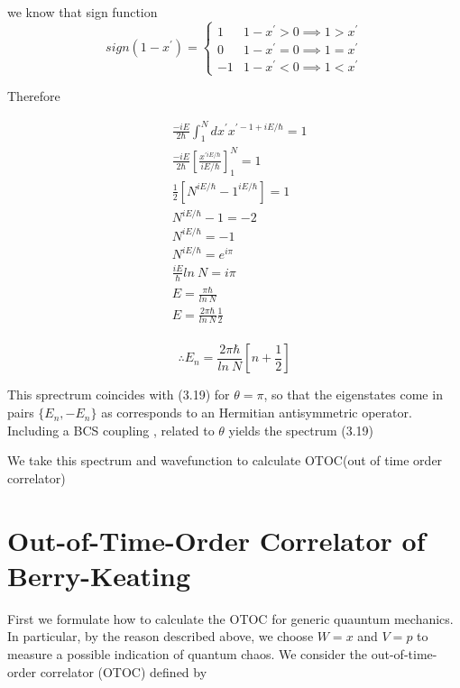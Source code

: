 \documentclass[12pt]{report}
\newcommand*{\1}{\hspace{1pt}}
\begin{document}
        we know that sign function
        \[ sign(1-x^{'}) = \begin{cases} 
            1 & 1-x^{'} > 0  \implies 1 > x^{'} \\
            0 & 1-x^{'} = 0 \implies 1=x^{'} \\
            -1 & 1-x^{'} < 0 \implies 1<x^{'} 
         \end{cases}
      \]

        Therefore

        \begin{align*}
            &\frac{-iE}{2\hbar}\int _{1}^{N} dx^{'} x^{' -1+iE/\hbar} = 1 \\
            &\frac{-iE}{2\hbar} \left[\frac{x^{'iE/\hbar}}{iE/\hbar}\right] _{1} ^{N} = 1 \\
            &\frac{1}{2} \left[N^{iE/\hbar} - 1^{iE/\hbar}\right] = 1 \\
            &N^{iE/\hbar} - 1 = -2 \\ 
            &N^{iE/\hbar} = -1 \\ 
            &N^{iE/\hbar} = e^{i\pi} \\ 
            &\frac{iE}{\hbar}ln\ N = i\pi \\ 
            &E = \frac{\pi\hbar}{ln\ N} \\ 
            &E = \frac{2\pi\hbar}{ln\ N}\frac{1}{2} \\  
        \end{align*}

        \begin{equation}
            \therefore E_{n} = \frac{2\pi\hbar}{ln\ N}\left[n + \frac{1}{2}\right] 
        \end{equation}

        This sprectrum coincides with (3.19) for $\theta=\pi$, so that the eigenstates come in pairs $\{E_{n}, -E_{n}\}$ as corresponds to an Hermitian antisymmetric
        operator. Including a BCS coupling , related to $\theta$ yields the spectrum (3.19)\cite{s9}

        We take this spectrum and wavefunction to calculate OTOC(out of time order correlator)

    \newpage


    \chapter{Out-of-Time-Order Correlator of Berry-Keating}
        
        First we formulate how to calculate the OTOC for generic quauntum mechanics. In particular, by the reason described above, we choose $W = x$ and $V = p$ to measure
        a possible indication of quantum chaos. We consider the out-of-time-order correlator (OTOC) defined by
\end{document}
